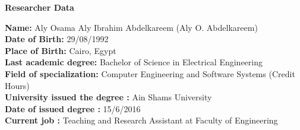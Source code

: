 \newpage
\thispagestyle{empty}

\begin{center}\huge \textbf{Researcher Data}\end{center}
\vspace{3em}
\begin{flushleft}
\textbf{Name:} Aly Osama Aly Ibrahim Abdelkareem (Aly O. Abdelkareem)\\

\textbf{Date of Birth:} 29/08/1992 \\

\textbf{Place of Birth:} Cairo, Egypt \\

\textbf{Last academic degree:} Bachelor of Science in Electrical Engineering \\

\textbf{Field of specialization:} Computer Engineering and Software Systems (Credit Hours) \\

\textbf{University issued the degree	:}  Ain Shams University\\

\textbf{Date of issued degree	:} 15/6/2016 \\


\textbf{Current job		:} Teaching and Research Assistant at Faculty of Engineering\\

\end{flushleft}
\vfill



